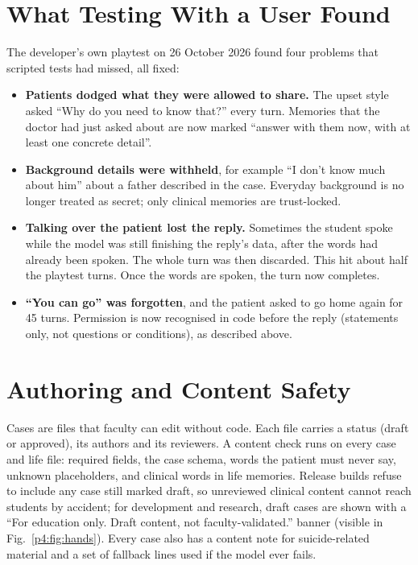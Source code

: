 \documentclass[journal]{IEEEtran}
\begin{document}
\section{What Testing With a User Found}
The developer's own playtest on 26 October 2026 found four problems that scripted tests had missed, all fixed:
\begin{itemize}
\item \textbf{Patients dodged what they were allowed to share.} The upset style asked ``Why do you need to know that?'' every turn. Memories that
the doctor had just asked about are now marked ``answer with them now, with at least one concrete detail''.
\item \textbf{Background details were withheld}, for example ``I don't know much about him'' about a father described in the case. Everyday
background is no longer treated as secret; only clinical memories are trust-locked.
\item \textbf{Talking over the patient lost the reply.} Sometimes the student spoke while the model was still finishing the reply's data, after the words had already been spoken. The whole turn was then discarded. This hit about half the playtest turns. Once the words are spoken, the turn now completes.
\item \textbf{``You can go'' was forgotten}, and the patient asked to go home again for 45 turns. Permission is now recognised in code before the
reply (statements only, not questions or conditions), as described above.
\end{itemize}

\section{Authoring and Content Safety}\label{sec:authoring}
Cases are files that faculty can edit without code. Each file carries a status (draft or approved), its authors and its reviewers. A content
check runs on every case and life file: required fields, the case schema, words the patient must never say, unknown placeholders, and clinical
words in life memories. Release builds refuse to include any case still marked draft, so unreviewed clinical content cannot reach students by
accident; for development and research, draft cases are shown with a ``For education only. Draft content, not faculty-validated.'' banner (visible in
Fig.~\ref{p4:fig:hands}). Every case also has a content note for suicide-related material and a set of fallback lines used if the model ever fails.
\end{document}

